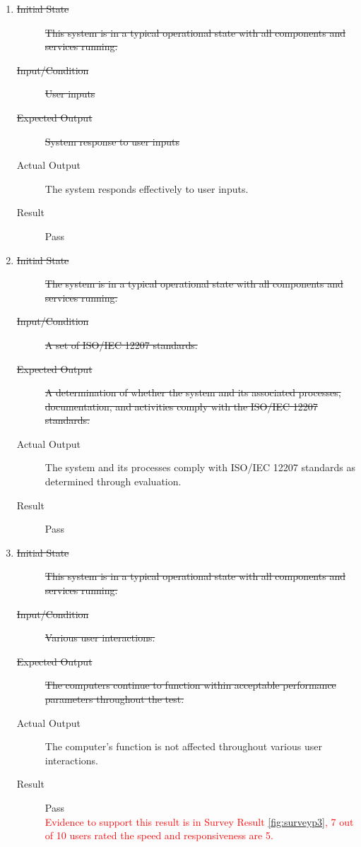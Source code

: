 \documentclass[12pt, titlepage]{article}
\newcommand{\rt}[1]{\textcolor{red}{#1}}
\begin{document}
\begin{enumerate}[NFR-T1]
  \item \label{NFRT27}
    \begin{description}
    \item[\sout{Initial State}]\sout{ This system is in a typical operational state with all
      components and services running.
    }\item[\sout{Input/Condition}]\sout{ User inputs
    }\item[\sout{Expected Output}]\sout{ System response to user inputs
    }\item[Actual Output] The system responds effectively to user inputs.
    \item[Result] Pass
    \end{description}
  \item \label{NFRT28}
    \begin{description}
    \item[\sout{Initial State}]\sout{ The system is in a typical operational state with all
      components and services running.
    }\item[\sout{Input/Condition}]\sout{ A set of ISO/IEC 12207 standards.
    }\item[\sout{Expected Output}]\sout{ A determination of whether the system and its associated
      processes, documentation, and activities comply with the ISO/IEC 12207
      standards.
    }\item[Actual Output] The system and its processes comply with ISO/IEC 12207
      standards as determined through evaluation.
    \item[Result] Pass
    \end{description}
  \item \label{NFRT29}
    \begin{description}
    \item[\sout{Initial State}]\sout{ This system is in a typical operational state with all
      components and services running.
    }\item[\sout{Input/Condition}]\sout{ Various user interactions.
    }\item[\sout{Expected Output}]\sout{ The computers continue to function within acceptable
      performance parameters throughout the test.
    }\item[Actual Output] The computer's function is not affected throughout various
      user interactions.
    \item[Result] Pass \\
    \rt{ Evidence to support this result is in Survey Result \ref{fig:surveyp3}, 7 out of 10 users rated the speed and responsiveness are 5. }

\end{description}
\end{enumerate}
\end{document}
